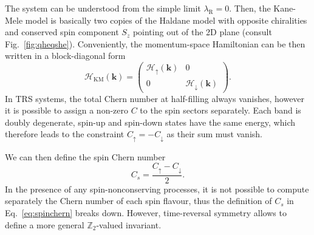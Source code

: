 The system can be understood from the simple limit $\lambda_{\mathrm{R}} = 0$. Then, the Kane-Mele model is basically two copies of the Haldane model with opposite chiralities and conserved spin component $S_z$ pointing out of the 2D plane (consult Fig.~\ref{fig:qheqshe}). Conveniently, the momentum-space Hamiltonian can be then written in a block-diagonal form
\begin{equation}
\mathcal{H}_{\mathrm{KM}} ( \mathbf{k}) = \begin{pmatrix}
\mathcal{H}_{\uparrow} ( \mathbf{k}) & 0 \\
0 & \mathcal{H}_{\downarrow} ( \mathbf{k})
\end{pmatrix}.
\label{eq:KM_Bloch_copies}
\end{equation}
In TRS systems, the total Chern number at half-filling always vanishes, however it is possible to assign a non-zero $C$ to the spin sectors separately. Each band is doubly degenerate, \ie spin-up and spin-down states have the same energy, which therefore leads to the constraint $C_{\uparrow} = - C_{\downarrow}$ as their sum must vanish. 

\hspace{-0.5cm}We can then define the spin Chern number~\cite{ShengCs2006}
\begin{equation}
C_s = \frac{C_{\uparrow} - C_{\downarrow}}{2}.
\label{eq:spinchern}
\end{equation}
In the presence of any spin-nonconserving processes, it is not possible to compute separately the Chern number of each spin flavour, thus the definition of $C_s$ in Eq.~\eqref{eq:spinchern} breaks down. However, time-reversal symmetry allows to define a more general $\mathbb{Z}_2$-valued invariant. 

